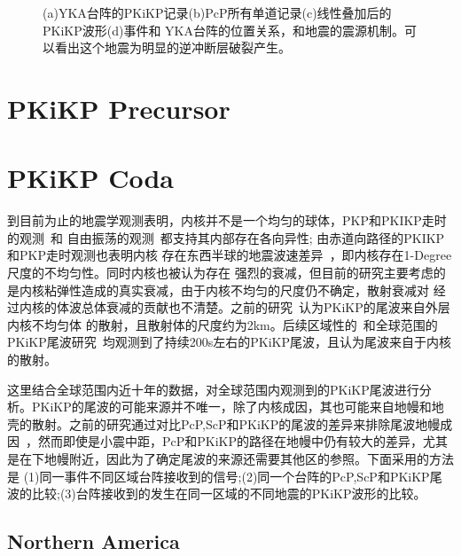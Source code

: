 \begin{figure}[!ht]
{}
	\hspace{3em}
	\caption{(a)YKA台阵的PKiKP记录(b)PcP所有单道记录(c)线性叠加后的PKiKP波形(d)事件和%
YKA台阵的位置关系，和地震的震源机制。可以看出这个地震为明显的逆冲断层破裂产生。}
\end{figure}

\newpage

\section{PKiKP Precursor}

\newpage

\section{PKiKP Coda}


到目前为止的地震学观测表明，内核并不是一个均匀的球体，PKP和PKIKP走时的观测~\citep{Creager1992}和
自由振荡的观测~\citep{Tromp1993}都支持其内部存在各向异性; 由赤道向路径的PKIKP和PKP走时观测也表明内核
存在东西半球的地震波速差异~\citep{Tanaka1997}，即内核存在1-Degree尺度的不均匀性。同时内核也被认为存在
强烈的衰减，但目前的研究主要考虑的是内核粘弹性造成的真实衰减，由于内核不均匀的尺度仍不确定，散射衰减对
经过内核的体波总体衰减的贡献也不清楚。之前的研究~\citep{Vidale2000}认为PKiKP的尾波来自外层内核不均匀体
的散射，且散射体的尺度约为2km。后续区域性的~\citep{Poupinet2004}和全球范围的PKiKP尾波研究~\citep{Koper2004}均观测到了持续200s左右的PKiKP尾波，且认为尾波来自于内核的散射。

这里结合全球范围内近十年的数据，对全球范围内观测到的PKiKP尾波进行分析。PKiKP的尾波的可能来源并不唯一，除了内核成因，其也可能来自地幔和地壳的散射。之前的研究通过对比PcP,ScP和PKiKP的尾波的差异来排除尾波地幔成因~\citep{Koper2004}，然而即使是小震中距，PcP和PKiKP的路径在地幔中仍有较大的差异，尤其是在下地幔附近，因此为了确定尾波的来源还需要其他区的参照。下面采用的方法是
(1)同一事件不同区域台阵接收到的信号;(2)同一个台阵的PcP,ScP和PKiKP尾波的比较;(3)台阵接收到的发生在同一区域的不同地震的PKiKP波形的比较。

\subsection{Northern America}

